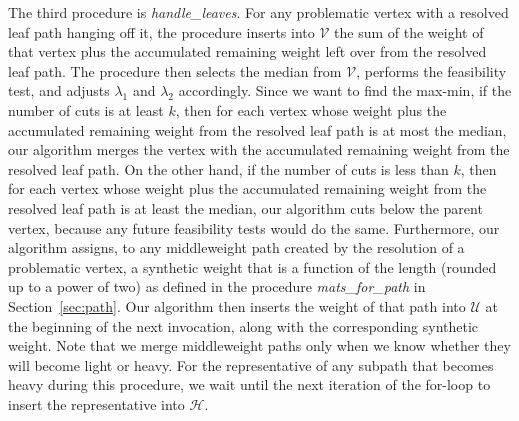 The third procedure is {\it handle\_leaves}. 
For any problematic vertex with a resolved leaf path hanging off it, the procedure inserts into $\mathcal{V}$ the sum of the weight of that vertex plus the accumulated remaining weight left over from the resolved leaf path. 
The procedure then selects the median from $\mathcal{V}$, performs the feasibility test, and adjusts $\lambda_1$ and $\lambda_2$ accordingly. 
Since we want to find the max-min, if the number of cuts is at least $k$, then for each vertex whose weight plus the accumulated remaining weight from the resolved leaf path is at most the median, our algorithm merges the vertex with the accumulated remaining weight from the resolved leaf path. 
On the other hand, if the number of cuts is less than $k$, then for each vertex whose weight plus the accumulated remaining weight from the resolved leaf path is at least the median, our algorithm cuts below the parent vertex, because any future feasibility tests would do the same.  
Furthermore, our algorithm assigns, to any middleweight path created by the resolution of a problematic vertex, a synthetic weight that is a function of the length (rounded up to a power of two) as defined in the procedure {\it mats\_for\_path} in Section~\ref{sec:path}. 
Our algorithm then inserts the weight of that path into $\mathcal{U}$ at the beginning of the next invocation, along with the corresponding synthetic weight. 
Note that we merge middleweight paths only when we know whether they will become light or heavy. 
For the representative of any subpath that becomes heavy during this procedure, we wait until the next iteration of the for-loop to insert the representative into $\mathcal{H}$.

